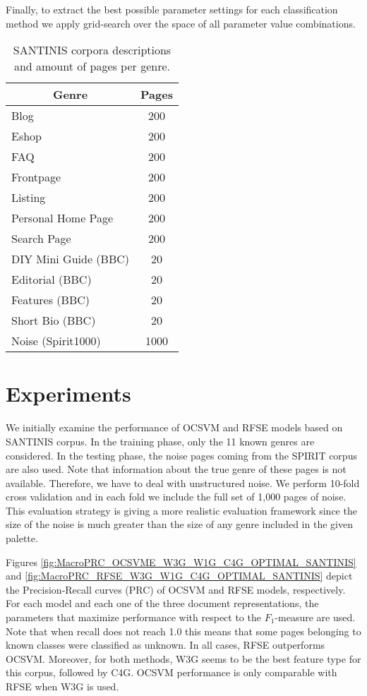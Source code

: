 \documentclass[runningheads]{llncs}
\begin{document}
Finally, to extract the best possible parameter settings for each classification method we apply grid-search over the space of all parameter value combinations.

\begin{table}
\center
\begin{tabular}{|l|l|}
\hline
\multicolumn{1}{|c|}{Genre} & \multicolumn{1}{c|}{Pages} \tabularnewline
\hline
\multicolumn{1}{|l|}{Blog} & \multicolumn{1}{c|}{200}  \tabularnewline
\multicolumn{1}{|l|}{Eshop} & \multicolumn{1}{c|}{200} \tabularnewline
\multicolumn{1}{|l|}{FAQ} & \multicolumn{1}{c|}{200} \tabularnewline
\multicolumn{1}{|l|}{Frontpage} & \multicolumn{1}{c|}{200} \tabularnewline
\multicolumn{1}{|l|}{Listing} & \multicolumn{1}{c|}{200} \tabularnewline
\multicolumn{1}{|l|}{Personal Home Page} & \multicolumn{1}{c|}{200} \tabularnewline
\multicolumn{1}{|l|}{Search Page} & \multicolumn{1}{c|}{200} \tabularnewline
\multicolumn{1}{|l|}{DIY Mini Guide (BBC)} & \multicolumn{1}{c|}{20} \tabularnewline
\multicolumn{1}{|l|}{Editorial (BBC)} & \multicolumn{1}{c|}{20} \tabularnewline
\multicolumn{1}{|l|}{Features (BBC)} & \multicolumn{1}{c|}{20} \tabularnewline
\multicolumn{1}{|l|}{Short Bio (BBC)} & \multicolumn{1}{c|}{20} \tabularnewline
\multicolumn{1}{|l|}{Noise (Spirit1000)} & \multicolumn{1}{c|}{1000}  \tabularnewline
\hline
\end{tabular}
\caption {SANTINIS corpora descriptions and amount of pages per genre.}
\label{tbl:genre_tags}
\end{table}


\section{Experiments}\label{sec:Experiments_Results}

We initially examine the performance of OCSVM and RFSE models based on SANTINIS corpus. In the training phase, only the 11 known genres are considered. In the testing phase, the noise pages coming from the SPIRIT corpus are also used. Note that information about the true genre of these pages is not available. Therefore, we have to deal with unstructured noise. We perform  10-fold cross validation and in each fold we include the full set of 1,000 pages of noise. This evaluation strategy is giving a more realistic evaluation framework since the size of the noise is much greater than the size of any genre included in the given palette.

Figures \ref{fig:MacroPRC_OCSVME_W3G_W1G_C4G_OPTIMAL_SANTINIS} and \ref{fig:MacroPRC_RFSE_W3G_W1G_C4G_OPTIMAL_SANTINIS} depict the Precision-Recall curves (PRC) of OCSVM and RFSE models, respectively. For each model and each one of the three document representations, the parameters that maximize performance with respect to the $F_{1}$-measure are used. Note that when recall does not reach 1.0 this means that some pages belonging to known classes were classified as unknown. In all cases, RFSE outperforms OCSVM. Moreover, for both methods, W3G seems to be the best feature type for this corpus, followed by C4G. OCSVM performance is only comparable with RFSE when W3G is used.
\end{document}
